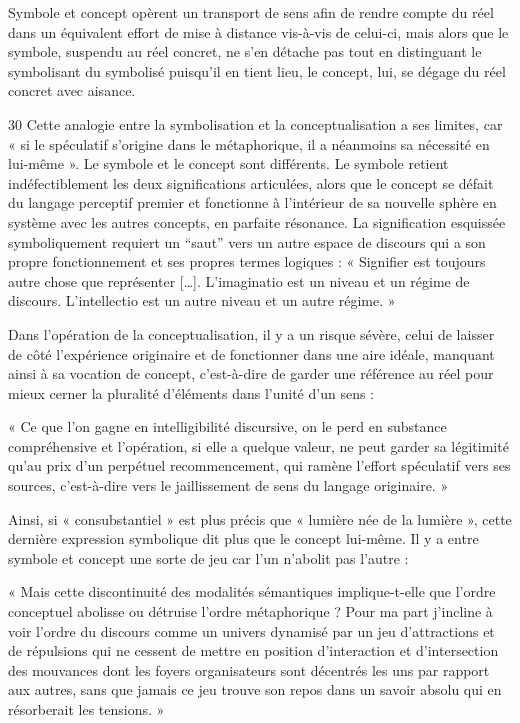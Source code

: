 Symbole et concept opèrent un transport de sens afin de rendre compte du réel dans un équivalent effort de mise à distance vis-à-vis de celui-ci, mais alors que le symbole, suspendu au réel concret, ne s’en détache pas tout en distinguant le symbolisant du symbolisé puisqu’il en tient lieu, le concept, lui, se dégage du réel concret avec aisance.

30
Cette analogie entre la symbolisation et la conceptualisation a ses limites, car « si le spéculatif s’origine dans le métaphorique, il a néanmoins sa nécessité en lui-même ». Le symbole et le concept sont différents. Le symbole retient indéfectiblement les deux significations articulées, alors que le concept se défait du langage perceptif premier et fonctionne à l’intérieur de sa nouvelle sphère en système avec les autres concepts, en parfaite résonance. La signification esquissée symboliquement requiert un “saut” vers un autre espace de discours qui a son propre fonctionnement et ses propres termes logiques : « Signifier est toujours autre chose que représenter […]. L’imaginatio est un niveau et un régime de discours. L’intellectio est un autre niveau et un autre régime. »

Dans l’opération de la conceptualisation, il y a un risque sévère, celui de laisser de côté l’expérience originaire et de fonctionner dans une aire idéale, manquant ainsi à sa vocation de concept, c’est-à-dire de garder une référence au réel pour mieux cerner la pluralité d’éléments dans l’unité d’un sens :

\vspace{0.24cm}
{\footnotesize « Ce que l’on gagne en intelligibilité discursive, on le perd en substance compréhensive et l’opération, si elle a quelque valeur, ne peut garder sa légitimité qu’au prix d’un perpétuel recommencement, qui ramène l’effort spéculatif vers ses sources, c’est-à-dire vers le jaillissement de sens du langage originaire. »}
\vspace{0.31cm}

Ainsi, si « consubstantiel » est plus précis que « lumière née de la lumière », cette dernière expression symbolique dit plus que le concept lui-même. Il y a entre symbole et concept une sorte de jeu car l’un n’abolit pas l’autre :

\vspace{0.24cm}
{\footnotesize « Mais cette discontinuité des modalités sémantiques implique-t-elle que l’ordre conceptuel abolisse ou détruise l’ordre métaphorique ? Pour ma part j’incline à voir l’ordre du discours comme un univers dynamisé par un jeu d’attractions et de répulsions qui ne cessent de mettre en position d’interaction et d’intersection des mouvances dont les foyers organisateurs sont décentrés les uns par rapport aux autres, sans que jamais ce jeu trouve son repos dans un savoir absolu qui en résorberait les tensions. »}
\vspace{0.31cm}

